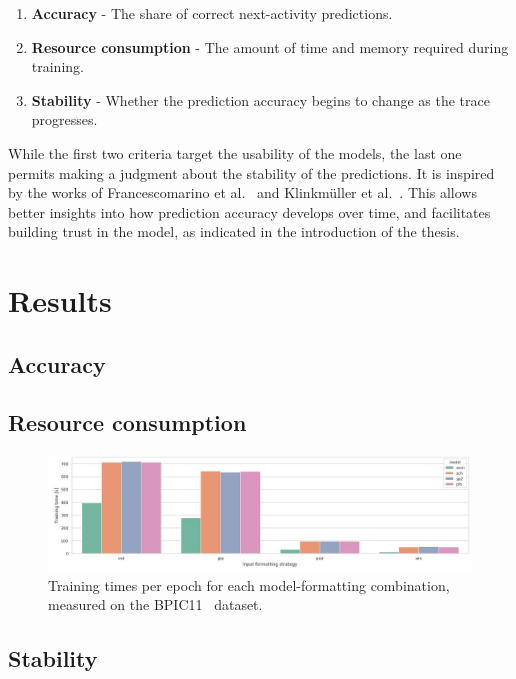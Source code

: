 \begin{enumerate}
    \item\textbf{Accuracy} - The share of correct next-activity predictions.
    \item\textbf{Resource consumption} - The amount of time and memory required during training.
    \item\textbf{Stability} - Whether the prediction accuracy begins to change as the trace progresses.
\end{enumerate}

While the first two criteria target the usability of the models, the last one permits making a judgment about the stability of the predictions. It is inspired by the works of Francescomarino et al.~\cite{francescomarino2015} and Klinkmüller et al.~\cite{klinkmuller2018reliablemonitoring}. This allows better insights into how prediction accuracy develops over time, and facilitates building trust in the model, as indicated in the introduction of the thesis.

\section{Results}\label{sec:eval:results}


\subsection*{Accuracy}

\subsection*{Resource consumption}
\begin{figure}
    \centering
    \includegraphics[width=\textwidth]{gfx/BPIC11-training-timings.jpg}
    \caption{Training times per epoch for each model-formatting combination, measured on the BPIC11~\cite{BPIC11} dataset.}
    \label{fig:timings_BPIC11}
\end{figure}

\subsection*{Stability}

